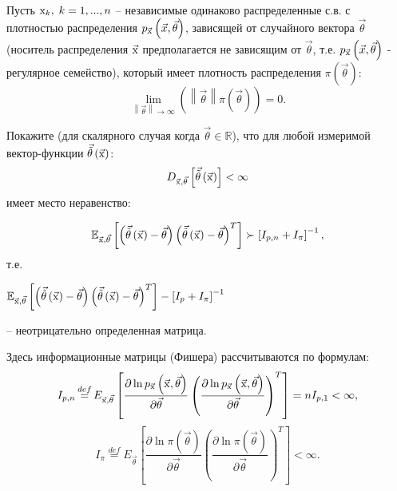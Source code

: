 \begin{problem} 
\label{van_tris}
Пусть ${\rm x}_{k} ,\; k=1,...,n$ -- независимые одинаково распределенные с.в. с плотностью распределения $p_{\vec{{\rm x}}} \left(\vec{x},\vec{\theta }\right)$, зависящей от случайного вектора $\vec{\theta }$ (носитель распределения $\vec{{\rm x}}$ предполагается не зависящим от $\vec{\theta }$, т.е. $p_{\vec{{\rm x}}} \left(\vec{x},\vec{\theta }\right)$ - регулярное семейство), который имеет плотность распределения $\pi (\vec{\theta })$: 
\[\mathop{\lim }\limits_{\left\| \vec{\theta }\right\| \to \infty } \left(\left\| \vec{\theta }\right\| \pi \left(\vec{\theta }\right)\right)=0.\] 

Покажите (для скалярного случая когда $\vec{\theta}  \in \mathbb{R}$), 
что для любой измеримой вектор-функции 
$\vec{\tilde{\theta }}\left(\vec{{\rm x}}\right)$: 
\[D_{\vec{{\rm x}},\vec{\theta }} \left[\vec{\tilde{\theta }}\left(\vec{{\rm x}}\right)\right]<\infty \] 
имеет место неравенство:

\[\mathrm{{\mathbb E}}_{\vec{{\rm x}},\vec{\theta }} \left[\left(\vec{\tilde{\theta }}\left(\vec{{\rm x}}\right)-\vec{\theta }\right)\left(\vec{\tilde{\theta }}\left(\vec{{\rm x}}\right)-\vec{\theta }\right)^{T} \right]\succ \left[I_{p,n} +I_{\pi } \right]^{-1},\] т.е.

\begin{center}
$\mathrm{{\mathbb E}}_{\vec{{\rm x}},\vec{\theta }} \left[\left(\vec{\tilde{\theta }}\left(\vec{{\rm x}}\right)-\vec{\theta }\right)\left(\vec{\tilde{\theta }}\left(\vec{{\rm x}}\right)-\vec{\theta }\right)^{T} \right]-\left[I_{p} +I_{\pi } \right]^{-1} $ 
\end{center}
-- неотрицательно определенная матрица.

Здесь информационные матрицы (Фишера) рассчитываются по формулам: 
\[I_{p,n} \mathop{=}\limits^{def} E_{\vec{{\rm x}},\vec{\theta }} \left[\frac{\partial \ln p_{\vec{{\rm x}}} \left(\vec{{\rm x}},\vec{\theta }\right)}{\partial \vec{\theta }} \left(\frac{\partial \ln p_{\vec{{\rm x}}} \left(\vec{{\rm x}},\vec{\theta }\right)}{\partial \vec{\theta }} \right)^{T} \right]=nI_{p,1} <\infty , 
\]
\[I_{\pi } \mathop{=}\limits^{def} E_{\vec{\theta }} \left[\frac{\partial \ln \pi \left(\vec{\theta }\right)}{\partial \vec{\theta }} \left(\frac{\partial \ln \pi \left(\vec{\theta }\right)}{\partial \vec{\theta }} \right)^{T} \right]<\infty .\] 

\end{problem}

